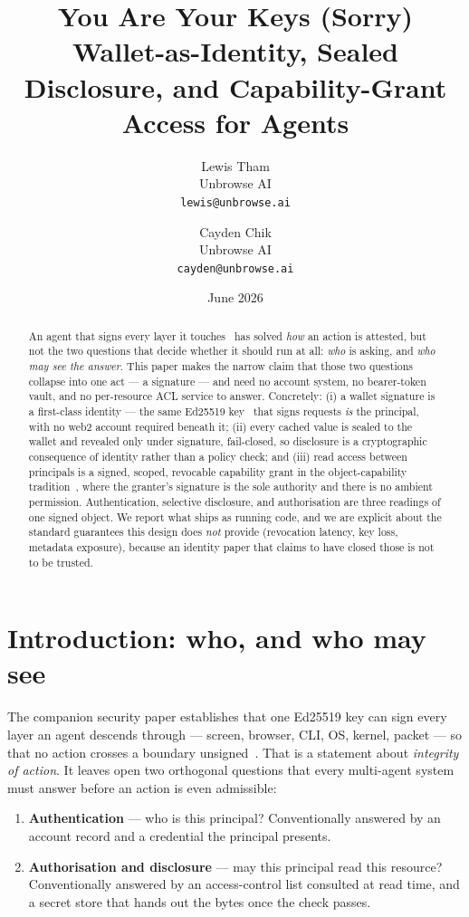 \documentclass[11pt]{article}
\title{\textbf{You Are Your Keys (Sorry)}\\
\large Wallet-as-Identity, Sealed Disclosure, and Capability-Grant Access for Agents}
\author{Lewis Tham\\ Unbrowse AI \\ \texttt{lewis@unbrowse.ai}
  \and Cayden Chik\\ Unbrowse AI \\ \texttt{cayden@unbrowse.ai}}
\date{June 2026}
\begin{document}
\maketitle

\begin{abstract}
An agent that signs every layer it touches~\cite{crypto} has solved \emph{how} an
action is attested, but not the two questions that decide whether it should run at
all: \emph{who} is asking, and \emph{who may see the answer}. This paper makes the
narrow claim that those two questions collapse into one act --- a signature --- and
need no account system, no bearer-token vault, and no per-resource ACL service to
answer. Concretely: (i) a
wallet signature is a first-class identity --- the same Ed25519 key~\cite{rfc8032}
that signs requests \emph{is} the principal, with no web2 account required beneath
it; (ii) every cached value is sealed to the wallet and revealed only under
signature, fail-closed, so disclosure is a cryptographic consequence of identity
rather than a policy check; and (iii) read access between principals is a signed,
scoped, revocable capability grant in the object-capability tradition~\cite{ocap,
macaroons}, where the granter's signature is the sole authority and there is no
ambient permission. Authentication, selective disclosure, and authorisation are
three readings of one signed object. We report what ships as running code, and we
are explicit about the standard guarantees this design does \emph{not} provide
(revocation latency, key loss, metadata exposure), because an identity paper that
claims to have closed those is not to be trusted.
\end{abstract}

\section{Introduction: who, and who may see}

The companion security paper establishes that one Ed25519 key can sign every layer
an agent descends through --- screen, browser, CLI, OS, kernel, packet --- so that
no action crosses a boundary unsigned~\cite{crypto}. That is a statement about
\emph{integrity of action}. It leaves open two orthogonal questions that every
multi-agent system must answer before an action is even admissible:

\begin{enumerate}[leftmargin=1.6em,itemsep=1pt]
  \item \textbf{Authentication} --- who is this principal? Conventionally answered by
  an account record and a credential the principal presents.
  \item \textbf{Authorisation and disclosure} --- may this principal read this
  resource? Conventionally answered by an access-control list consulted at read time,
  and a secret store that hands out the bytes once the check passes.
\end{enumerate}
\end{document}
